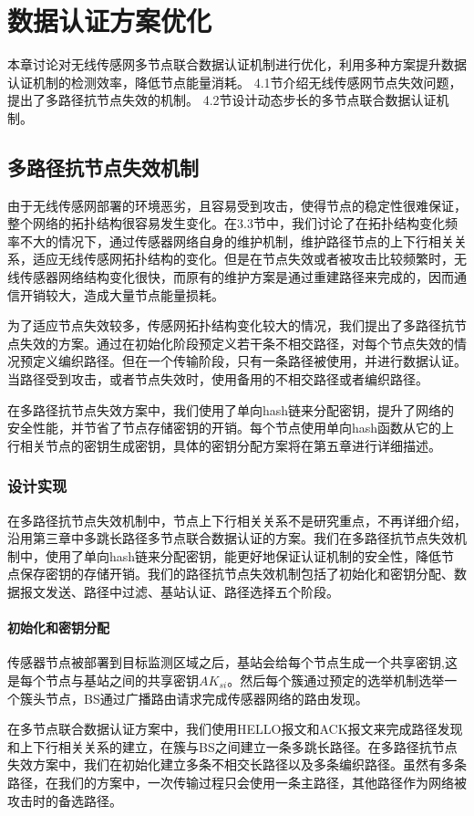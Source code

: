 \chapter{数据认证方案优化}
本章讨论对无线传感网多节点联合数据认证机制进行优化，利用多种方案提升数据认证机制的检测效率，降低节点能量消耗。
4.1节介绍无线传感网节点失效问题，提出了多路径抗节点失效的机制。
4.2节设计动态步长的多节点联合数据认证机制。
\section{多路径抗节点失效机制}
由于无线传感网部署的环境恶劣，且容易受到攻击，使得节点的稳定性很难保证，整个网络的拓扑结构很容易发生变化。在3.3节中，我们讨论了在拓扑结构变化频率不大的情况下，通过传感器网络自身的维护机制，维护路径节点的上下行相关关系，适应无线传感网拓扑结构的变化。但是在节点失效或者被攻击比较频繁时，无线传感器网络结构变化很快，而原有的维护方案是通过重建路径来完成的，因而通信开销较大，造成大量节点能量损耗。

为了适应节点失效较多，传感网拓扑结构变化较大的情况，我们提出了多路径抗节点失效的方案。通过在初始化阶段预定义若干条不相交路径，对每个节点失效的情况预定义编织路径。但在一个传输阶段，只有一条路径被使用，并进行数据认证。当路径受到攻击，或者节点失效时，使用备用的不相交路径或者编织路径。

在多路径抗节点失效方案中，我们使用了单向hash链来分配密钥，提升了网络的安全性能，并节省了节点存储密钥的开销。每个节点使用单向hash函数从它的上行相关节点的密钥生成密钥，具体的密钥分配方案将在第五章进行详细描述。
\subsection{设计实现}
在多路径抗节点失效机制中，节点上下行相关关系不是研究重点，不再详细介绍，沿用第三章中多跳长路径多节点联合数据认证的方案。我们在多路径抗节点失效机制中，使用了单向hash链来分配密钥，能更好地保证认证机制的安全性，降低节点保存密钥的存储开销。我们的路径抗节点失效机制包括了初始化和密钥分配、数据报文发送、路径中过滤、基站认证、路径选择五个阶段。
\subsubsection{初始化和密钥分配}
传感器节点被部署到目标监测区域之后，基站会给每个节点生成一个共享密钥,这是每个节点与基站之间的共享密钥$AK_{si}$。然后每个簇通过预定的选举机制选举一个簇头节点，BS通过广播路由请求完成传感器网络的路由发现。

在多节点联合数据认证方案中，我们使用HELLO报文和ACK报文来完成路径发现和上下行相关关系的建立，在簇与BS之间建立一条多跳长路径。在多路径抗节点失效方案中，我们在初始化建立多条不相交长路径以及多条编织路径。虽然有多条路径，在我们的方案中，一次传输过程只会使用一条主路径，其他路径作为网络被攻击时的备选路径。

